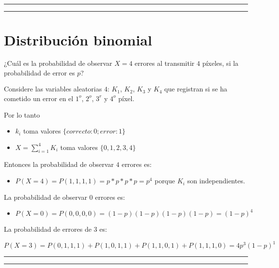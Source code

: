 \documentclass[
]{book}
\providecommand{\tightlist}{%
  \setlength{\itemsep}{0pt}\setlength{\parskip}{0pt}}
\begin{document}
\begin{center}\rule{0.5\linewidth}{0.5pt}\end{center}

\begin{center}\rule{0.5\linewidth}{0.5pt}\end{center}

\hypertarget{distribuciuxf3n-binomial-1}{%
\section{Distribución binomial}\label{distribuciuxf3n-binomial-1}}

¿Cuál es la probabilidad de observar \(X=4\) errores al transmitir \(4\) píxeles, si la probabilidad de error es \(p\)?

Considere las variables aleatorias \(4\): \(K_1\), \(K_2\), \(K_3\) y \(K_4\) que registran si se ha cometido un error en el \(1^{o}\), \(2^{o}\), \(3^{r}\) y \(4^{o}\) píxel.

Por lo tanto

\begin{itemize}
\item
  \(k_i\) toma valores \(\{correcto:0; error:1\}\)
\item
  \(X=\sum_{i=1}^4 K_i\) toma valores \(\{0,1,2,3,4\}\)
\end{itemize}

Entonces la probabilidad de observar \(4\) errores es:

\begin{itemize}
\tightlist
\item
  \(P(X=4)=P(1,1,1,1)=p*p*p*p=p^4\) porque \(K_i\) son independientes.
\end{itemize}

La probabilidad de observar \(0\) errores es:

\begin{itemize}
\tightlist
\item
  \(P(X=0)=P(0,0,0,0)=(1-p)(1-p)(1-p)(1-p)=(1-p)^4\)
\end{itemize}

La probabilidad de errores de \(3\) es:

\(P(X=3)=P(0,1,1,1)+P(1,0,1,1)+P(1,1,0,1)+P(1,1,1,0)=4p^3(1-p)^1\)

\begin{center}\rule{0.5\linewidth}{0.5pt}\end{center}

\begin{center}\rule{0.5\linewidth}{0.5pt}\end{center}
\end{document}
